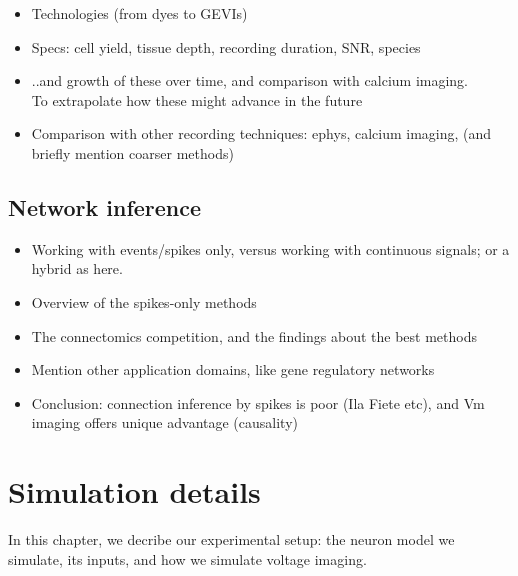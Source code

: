 \documentclass[a4paper, oneside, 11pt]{memoir}
\begin{document}
\begin{itemize}
    \item Technologies (from dyes to GEVIs)
    \item Specs: cell yield, tissue depth, recording duration, SNR, species
    \item ..and growth of these over time, and comparison with calcium imaging.\\
        To extrapolate how these might advance in the future
    \item Comparison with other recording techniques: ephys, calcium imaging, (and briefly mention coarser methods)
\end{itemize}


\section{Network inference}

\begin{itemize}
    \item Working with events/spikes only, versus working with continuous signals; or a hybrid as here.
    \item Overview of the spikes-only methods
    \item The connectomics competition, and the findings about the best methods
    \item Mention other application domains, like gene regulatory networks
    \item Conclusion: connection inference by spikes is poor (Ila Fiete etc), and Vm imaging offers unique advantage (causality)
\end{itemize}




\chapter{Simulation details}
\label{ch2}

In this chapter, we decribe our experimental setup: the neuron model we simulate, its inputs, and how we simulate voltage imaging.


\end{document}
